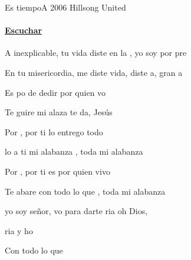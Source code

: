 \documentclass[12pt, spanish]{book}
\begin{document}
    \begin{song}{Es tiempo}{A}
        {2006} %
        {Hillsong United}
        {} %
        {}
        \ifChordBk
        \paragraph{\mbox{}\hfill\protect\href{https://open.spotify.com/intl-es/track/0L9OZtrAn0sGikOzyHRCPF}{Escuchar}\mbox{}\hfill}
        \fi



        \begin{SBOpGroup}
            A inexplicable, tu vida diste en la , yo soy por pre

            En tu misericordia, me diste vida, diste a,  gran a
        \end{SBOpGroup}
        \vskip 20pt
        \begin{SBOpGroup}
            Es po de dedir por quien vo

            Te guire mi alaza te da, Jesús
        \end{SBOpGroup}

        \begin{SBChorus}
            Por , por ti lo entrego todo

            lo a ti mi alabanza , toda mi alabanza 

            Por , por ti es por quien vivo

            Te abare con todo lo que , toda mi alabanza 
        \end{SBChorus}


        \begin{SBOpGroup}
            yo soy señor, vo para darte ria oh Dios,

            ria y ho
        \end{SBOpGroup}
        \vskip 20pt
        \begin{SBOpGroup}
            Con todo lo que 


\end{SBOpGroup}
\end{song}
\end{document}

